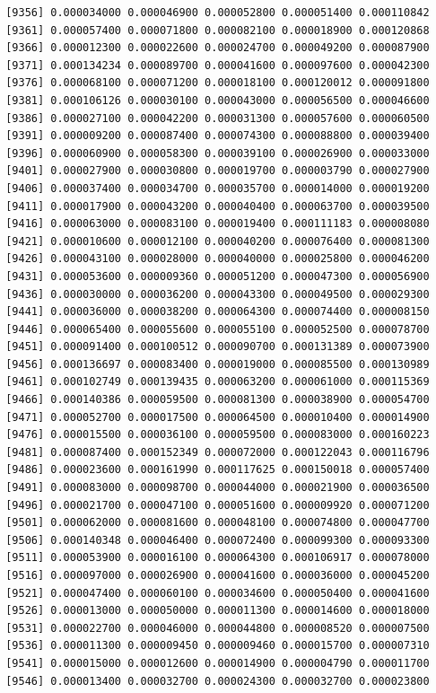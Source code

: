 \documentclass[]{article}
\begin{document}
\begin{verbatim}
 [9356] 0.000034000 0.000046900 0.000052800 0.000051400 0.000110842
 [9361] 0.000057400 0.000071800 0.000082100 0.000018900 0.000120868
 [9366] 0.000012300 0.000022600 0.000024700 0.000049200 0.000087900
 [9371] 0.000134234 0.000089700 0.000041600 0.000097600 0.000042300
 [9376] 0.000068100 0.000071200 0.000018100 0.000120012 0.000091800
 [9381] 0.000106126 0.000030100 0.000043000 0.000056500 0.000046600
 [9386] 0.000027100 0.000042200 0.000031300 0.000057600 0.000060500
 [9391] 0.000009200 0.000087400 0.000074300 0.000088800 0.000039400
 [9396] 0.000060900 0.000058300 0.000039100 0.000026900 0.000033000
 [9401] 0.000027900 0.000030800 0.000019700 0.000003790 0.000027900
 [9406] 0.000037400 0.000034700 0.000035700 0.000014000 0.000019200
 [9411] 0.000017900 0.000043200 0.000040400 0.000063700 0.000039500
 [9416] 0.000063000 0.000083100 0.000019400 0.000111183 0.000008080
 [9421] 0.000010600 0.000012100 0.000040200 0.000076400 0.000081300
 [9426] 0.000043100 0.000028000 0.000040000 0.000025800 0.000046200
 [9431] 0.000053600 0.000009360 0.000051200 0.000047300 0.000056900
 [9436] 0.000030000 0.000036200 0.000043300 0.000049500 0.000029300
 [9441] 0.000036000 0.000038200 0.000064300 0.000074400 0.000008150
 [9446] 0.000065400 0.000055600 0.000055100 0.000052500 0.000078700
 [9451] 0.000091400 0.000100512 0.000090700 0.000131389 0.000073900
 [9456] 0.000136697 0.000083400 0.000019000 0.000085500 0.000130989
 [9461] 0.000102749 0.000139435 0.000063200 0.000061000 0.000115369
 [9466] 0.000140386 0.000059500 0.000081300 0.000038900 0.000054700
 [9471] 0.000052700 0.000017500 0.000064500 0.000010400 0.000014900
 [9476] 0.000015500 0.000036100 0.000059500 0.000083000 0.000160223
 [9481] 0.000087400 0.000152349 0.000072000 0.000122043 0.000116796
 [9486] 0.000023600 0.000161990 0.000117625 0.000150018 0.000057400
 [9491] 0.000083000 0.000098700 0.000044000 0.000021900 0.000036500
 [9496] 0.000021700 0.000047100 0.000051600 0.000009920 0.000071200
 [9501] 0.000062000 0.000081600 0.000048100 0.000074800 0.000047700
 [9506] 0.000140348 0.000046400 0.000072400 0.000099300 0.000093300
 [9511] 0.000053900 0.000016100 0.000064300 0.000106917 0.000078000
 [9516] 0.000097000 0.000026900 0.000041600 0.000036000 0.000045200
 [9521] 0.000047400 0.000060100 0.000034600 0.000050400 0.000041600
 [9526] 0.000013000 0.000050000 0.000011300 0.000014600 0.000018000
 [9531] 0.000022700 0.000046000 0.000044800 0.000008520 0.000007500
 [9536] 0.000011300 0.000009450 0.000009460 0.000015700 0.000007310
 [9541] 0.000015000 0.000012600 0.000014900 0.000004790 0.000011700
 [9546] 0.000013400 0.000032700 0.000024300 0.000032700 0.000023800

\end{verbatim}
\end{document}
